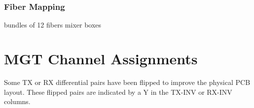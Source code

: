 \documentclass[letterpaper]{article}
\begin{document}
\subsubsection{Fiber Mapping}
bundles of 12 fibers
mixer boxes



















\newpage
\section{MGT Channel Assignments}
\label{Appendix_MGTs}

Some TX or RX differential pairs have been flipped to improve the physical PCB layout.  These flipped pairs are indicated by a Y in the TX-INV or RX-INV columns.

\end{document}
